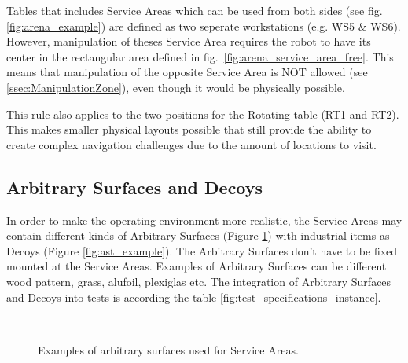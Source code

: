 Tables that includes Service Areas which can be used from both sides (see fig. \ref{fig:arena_example}) are defined as two seperate workstations (e.g. WS5 \& WS6). However, manipulation of theses Service Area requires the robot to have its center in the rectangular area defined in fig.~\ref{fig:arena_service_area_free}. This means that manipulation of the opposite Service Area is NOT allowed (see \ref{ssec:ManipulationZone}), even though it would be physically possible.

This rule also applies to the two positions for the Rotating table (RT1 and RT2).
This makes smaller physical layouts possible that still provide the ability to create complex navigation challenges due to the amount of locations to visit.


\subsection{Arbitrary Surfaces and Decoys}
\label{subsec:Arbitrary_Surfaces_and_Decoys}

In order to make the operating environment more realistic, the Service Areas may contain different kinds of Arbitrary Surfaces (Figure \ref{fig:ast_surface_example}) with industrial items as Decoys (Figure \ref{fig:ast_example}). The Arbitrary Surfaces don't have to be fixed mounted at the Service Areas. Examples of Arbitrary Surfaces can be different wood pattern, grass, alufoil, plexiglas etc. The integration of Arbitrary Surfaces and Decoys into tests is according the table \ref{fig:test_specifications_instance}.


\begin{figure}[h!]
	\centering
	\hspace{.05\textwidth}
	\hspace{.05\textwidth}
	\\
	\hspace{.05\textwidth}
	\caption{Examples of arbitrary surfaces used for Service Areas.}
	\label{fig:ast_surface_example}
\end{figure}

